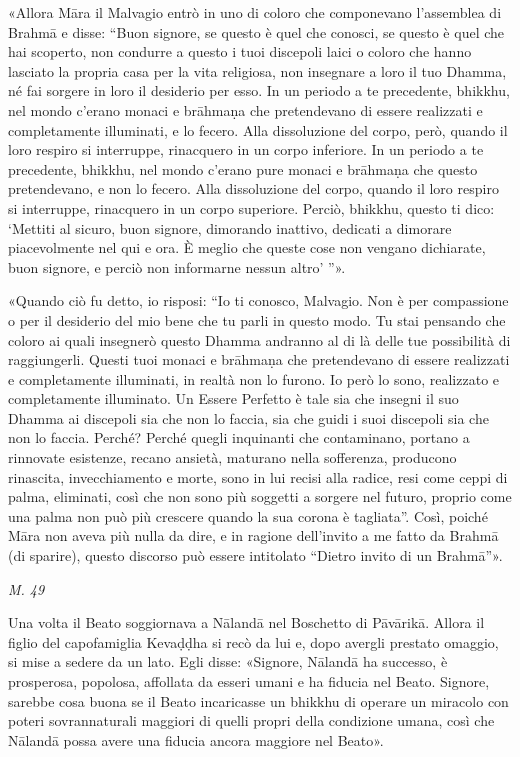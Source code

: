 «Allora Māra il Malvagio entrò in uno di coloro che componevano
l’assemblea di Brahmā e disse: “Buon signore, se questo è quel che
conosci, se questo è quel che hai scoperto, non condurre a questo i tuoi
discepoli laici o coloro che hanno lasciato la propria casa per la vita
religiosa, non insegnare a loro il tuo Dhamma, né fai sorgere in loro il
desiderio per esso. In un periodo a te precedente, bhikkhu, nel mondo
c’erano monaci e brāhmaṇa che pretendevano di essere realizzati e
completamente illuminati, e lo fecero. Alla dissoluzione del corpo,
però, quando il loro respiro si interruppe, rinacquero in un corpo
inferiore. In un periodo a te precedente, bhikkhu, nel mondo c’erano
pure monaci e brāhmaṇa che questo pretendevano, e non lo fecero. Alla
dissoluzione del corpo, quando il loro respiro si interruppe, rinacquero
in un corpo superiore. Perciò, bhikkhu, questo ti dico: ‘Mettiti al
sicuro, buon signore, dimorando inattivo, dedicati a dimorare
piacevolmente nel qui e ora. È meglio che queste cose non vengano
dichiarate, buon signore, e perciò non informarne nessun altro’ ”».


«Quando ciò fu detto, io risposi: “Io ti conosco, Malvagio. Non è per
compassione o per il desiderio del mio bene che tu parli in questo modo.
Tu stai pensando che coloro ai quali insegnerò questo Dhamma andranno al
di là delle tue possibilità di raggiungerli. Questi tuoi monaci e
brāhmaṇa che pretendevano di essere realizzati e completamente
illuminati, in realtà non lo furono. Io però lo sono, realizzato e
completamente illuminato. Un Essere Perfetto è tale sia che insegni il
suo Dhamma ai discepoli sia che non lo faccia, sia che guidi i suoi
discepoli sia che non lo faccia. Perché? Perché quegli inquinanti che
contaminano, portano a rinnovate esistenze, recano ansietà, maturano
nella sofferenza, producono rinascita, invecchiamento e morte, sono in
lui recisi alla radice, resi come ceppi di palma, eliminati, così che
non sono più soggetti a sorgere nel futuro, proprio come una palma non
può più crescere quando la sua corona è tagliata”. Così, poiché Māra non
aveva più nulla da dire, e in ragione dell’invito a me fatto da Brahmā
(di sparire), questo discorso può essere intitolato “Dietro invito di un
Brahmā”».


\emph{M. 49}


Una volta il Beato soggiornava a Nālandā nel Boschetto di Pāvārikā.
Allora il figlio del capofamiglia Kevaḍḍha si recò da lui e, dopo
avergli prestato omaggio, si mise a sedere da un lato. Egli disse:
«Signore, Nālandā ha successo, è prosperosa, popolosa, affollata da
esseri umani e ha fiducia nel Beato. Signore, sarebbe cosa buona se il
Beato incaricasse un bhikkhu di operare un miracolo con poteri
sovrannaturali maggiori di quelli propri della condizione umana, così
che Nālandā possa avere una fiducia ancora maggiore nel Beato».


